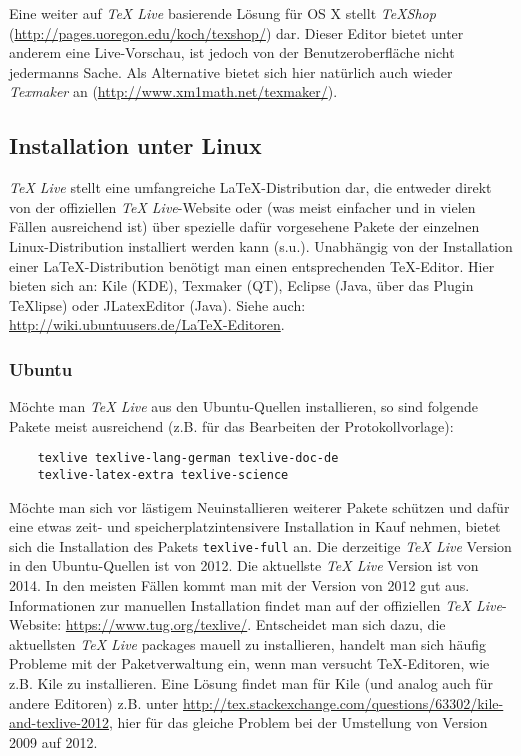 Eine weiter auf \textit{TeX Live} basierende Lösung für OS X stellt \textit{TeXShop} (\url{http://pages.uoregon.edu/koch/texshop/}) dar. Dieser Editor bietet unter anderem eine Live-Vorschau, ist jedoch von der Benutzeroberfläche nicht jedermanns Sache. 
Als Alternative bietet sich hier natürlich auch wieder \textit{Texmaker} an 
(\url{http://www.xm1math.net/texmaker/}).

\subsection{Installation unter Linux}
\textit{TeX Live} stellt eine umfangreiche LaTeX-Distribution dar, die entweder 
direkt von der offiziellen \textit{TeX Live}-Website oder (was meist einfacher 
und in vielen Fällen ausreichend ist) über spezielle dafür vorgesehene Pakete 
der einzelnen Linux-Distribution installiert werden kann (s.u.). Unabhängig von 
der Installation einer LaTeX-Distribution benötigt man einen entsprechenden 
TeX-Editor. Hier bieten sich an: Kile (KDE), Texmaker (QT), Eclipse (Java, über 
das Plugin TeXlipse) oder JLatexEditor (Java). Siehe auch: 
\url{http://wiki.ubuntuusers.de/LaTeX-Editoren}.

\subsubsection{Ubuntu}
Möchte man \textit{TeX Live} aus den Ubuntu-Quellen installieren, so sind 
folgende Pakete meist ausreichend (z.B. für das Bearbeiten der 
Protokollvorlage):
\begin{verbatim}
	texlive texlive-lang-german texlive-doc-de
	texlive-latex-extra texlive-science
\end{verbatim}
Möchte man sich vor lästigem Neuinstallieren weiterer Pakete schützen und dafür 
eine etwas zeit- und speicherplatzintensivere Installation in Kauf nehmen, 
bietet sich die Installation des Pakets \verb|texlive-full| an. Die derzeitige 
\textit{TeX Live} Version in den Ubuntu-Quellen ist von 2012. Die aktuellste 
\textit{TeX Live} Version ist von 2014. In den meisten Fällen kommt man mit der 
Version von 2012 gut aus. Informationen zur manuellen Installation findet man 
auf der offiziellen \textit{TeX Live}-Website: 
\url{https://www.tug.org/texlive/}. Entscheidet man sich dazu, die aktuellsten 
\textit{TeX Live} packages mauell zu installieren, handelt man sich häufig 
Probleme mit der Paketverwaltung ein, wenn man versucht TeX-Editoren, wie z.B. 
Kile zu installieren. Eine Lösung findet man für Kile (und analog auch für 
andere Editoren) z.B. unter 
\url{http://tex.stackexchange.com/questions/63302/kile-and-texlive-2012}, hier 
für das gleiche Problem bei der Umstellung von Version 2009 auf 2012.

